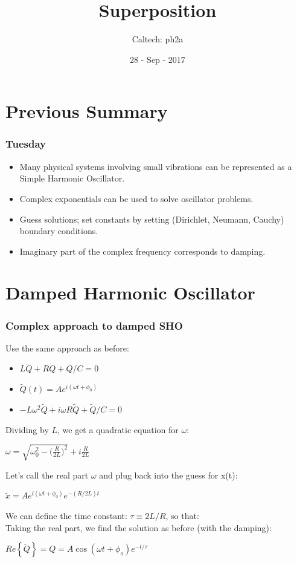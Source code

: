 \documentclass[pdf,hideothersubsections]{beamer}
\begin{document}
\title{Superposition}  
\author{Caltech: ph2a}
\date{28 - Sep - 2017}

\frame{\titlepage} 


\section{Previous Summary}
\begin{frame}
\frametitle{Tuesday}
\begin{itemize}
\item Many physical systems involving small vibrations can be represented as a Simple Harmonic Oscillator.

\item Complex exponentials can be used to solve oscillator problems.

\item Guess solutions; set constants by setting (Dirichlet, Neumann, Cauchy) boundary conditions.

\item Imaginary part of the complex frequency corresponds to damping.
\end{itemize}
\end{frame}


\section{Damped Harmonic Oscillator}
\begin{frame}
\frametitle{Complex approach to damped SHO}
Use the same approach as before:
\begin{itemize}
\item $L \ddot{Q} + R \dot{Q} + Q/C = 0$
\pause
\item $\tilde{Q}(t) = A e^{i (\omega t + \phi_0)}$
\pause
\item $-L \omega^2 \tilde{Q} + i \omega R \tilde{Q} + \tilde{Q}/C = 0$
\end{itemize}
\pause
Dividing by $L$, we get a quadratic equation for $\omega$: \\
\pause
\begin{center}
$\omega = \sqrt{\omega_0^2 - \Big(\frac{R}{2 L}\Big)^2} + i \frac{R}{2 L}$ \\
\end{center}
\pause
Let's call the real part $\omega$ and plug back into the guess for x(t):
\pause
\begin{center}
$\tilde{x} = A e^{i (\omega t + \phi_0)} e^{-(R/2 L) t}$\\
\end{center}
\pause
We can define the time constant: $\tau \equiv 2 L/R$, so that: \\
\pause
Taking the real part, we find the solution as before (with the damping): \\
\pause
\begin{center}
$Re\left\{\tilde{Q}\right\} = Q = A \cos(\omega t + \phi_o) e^{-t/\tau}$
\end{center}

\end{frame}
\end{document}
